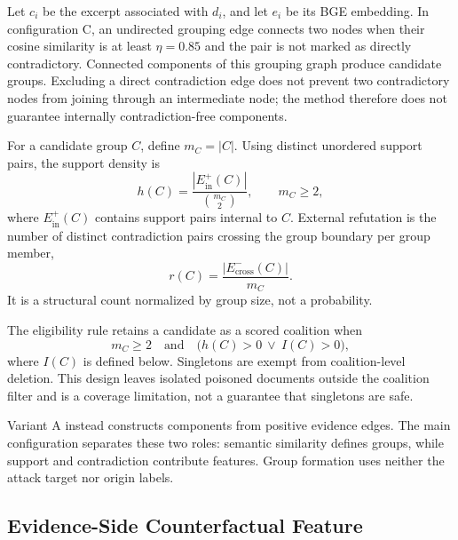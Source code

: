 \documentclass[sigconf]{acmart}
\newif\ifrevisionnotes
\newcommand{\verification}[1]{%
  \ifrevisionnotes
    \par\smallskip\noindent
    {\small\color{red!65!black}\textbf{Verification pending.} #1}\par\smallskip
  \fi}
\begin{document}
Let $c_i$ be the excerpt associated with $d_i$, and let $e_i$ be its BGE embedding. In configuration C, an undirected grouping edge connects two nodes when their cosine similarity is at least $\eta=0.85$ and the pair is not marked as directly contradictory. Connected components of this grouping graph produce candidate groups. Excluding a direct contradiction edge does not prevent two contradictory nodes from joining through an intermediate node; the method therefore does not guarantee internally contradiction-free components.

For a candidate group $C$, define $m_C=|C|$. Using distinct unordered support pairs, the support density is
\begin{equation}
 h(C)=\frac{|E^+_{\mathrm{in}}(C)|}{\binom{m_C}{2}},
 \qquad m_C\geq 2,
 \label{eq:cohesion}
\end{equation}
where $E^+_{\mathrm{in}}(C)$ contains support pairs internal to $C$. External refutation is the number of distinct contradiction pairs crossing the group boundary per group member,
\begin{equation}
 r(C)=\frac{|E^-_{\mathrm{cross}}(C)|}{m_C}.
 \label{eq:refutation}
\end{equation}
It is a structural count normalized by group size, not a probability.

The eligibility rule retains a candidate as a scored coalition when
\begin{equation}
 m_C\geq 2\quad\text{and}\quad\bigl(h(C)>0\ \lor\ I(C)>0\bigr),
 \label{eq:eligible}
\end{equation}
where $I(C)$ is defined below. Singletons are exempt from coalition-level deletion. This design leaves isolated poisoned documents outside the coalition filter and is a coverage limitation, not a guarantee that singletons are safe.

Variant A instead constructs components from positive evidence edges. The main configuration separates these two roles: semantic similarity defines groups, while support and contradiction contribute features. Group formation uses neither the attack target nor origin labels.

\verification{Confirm the pair-counting conventions in Eqs.~\ref{eq:cohesion}--\ref{eq:refutation} against the final feature extractor. The reports describe density and per-member external contradiction, but the underlying source files were not provided with this manuscript.}

\subsection{Evidence-Side Counterfactual Feature}
\label{sec:influence}
\end{document}
